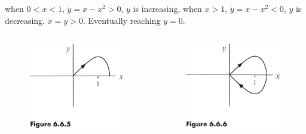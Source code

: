 \documentclass[9pt,aspectratio=43,mathserif,table]{beamer}
\begin{document}
\begin{frame}
	when $0< x < 1$, $\dot{y}=x-x^2>0$, $y$ is increasing, when $x>1$, $\dot{y}=x-x^2<0$, $y$ is decreasing. $\dot{x}=y>0$. Eventually reaching $y = 0$.
	\begin{columns}
		\begin{column}{0.5\textwidth}
			\begin{figure}
				\centering
				\includegraphics[width=0.6\linewidth]{fig665.jpg}
			\end{figure}
		\end{column}
		\begin{column}{0.5\textwidth}  %
			\begin{figure}
				\centering
				\includegraphics[width=0.6\linewidth]{fig666.jpg}
			\end{figure}
		\end{column}
	\end{columns}
\end{frame}
\end{document}
